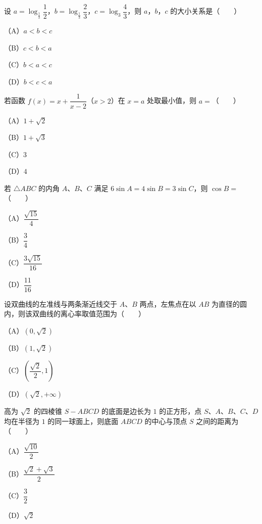 \begin{question}
设 $a=\log_{\frac13}\dfrac12$，$b=\log_{\frac13}\dfrac23$，$c=\log_3\dfrac43$，则 $a$，$b$，$c$ 的大小关系是\mbox{（　　）}

（A）$a<b<c$

（B）$c<b<a$

（C）$b<a<c$

（D）$b<c<a$

\end{question}
\begin{question}
若函数 $f(x)=x+\dfrac1{x-2}$（$x>2$）在 $x=a$ 处取最小值，则 $a=$\mbox{（　　）}

（A）$1+\sqrt2$

（B）$1+\sqrt3$

（C）$3$

（D）$4$

\end{question}
\begin{question}
若 $\triangle ABC$ 的内角 $A$、$B$、$C$ 满足 $6\sin A=4\sin B=3\sin C$，则 $\cos B=$\mbox{（　　）}

（A）$\dfrac{\sqrt{15}}4$

（B）$\dfrac34$

（C）$\dfrac{3\sqrt{15}}{16}$

（D）$\dfrac{11}{16}$

\end{question}
\begin{question}
设双曲线的左准线与两条渐近线交于 $A$、$B$ 两点，左焦点在以 $AB$ 为直径的圆内，则该双曲线的离心率取值范围为\mbox{（　　）}

（A）$\left(0,\sqrt2\right)$

（B）$\left(1,\sqrt2\right)$

（C）$\left(\dfrac{\sqrt2}2,1\right)$

（D）$\left(\sqrt2,+\infty\right)$

\end{question}
\begin{question}
高为 $\sqrt2$ 的四棱锥 $S-ABCD$ 的底面是边长为 $1$ 的正方形，点 $S$、$A$、$B$、$C$、$D$ 均在半径为 $1$ 的同一球面上，则底面 $ABCD$ 的中心与顶点 $S$ 之间的距离为\mbox{（　　）}

（A）$\dfrac{\sqrt{10}}2$

（B）$\dfrac{\sqrt2+\sqrt3}2$

（C）$\dfrac32$

（D）$\sqrt2$

\end{question}

